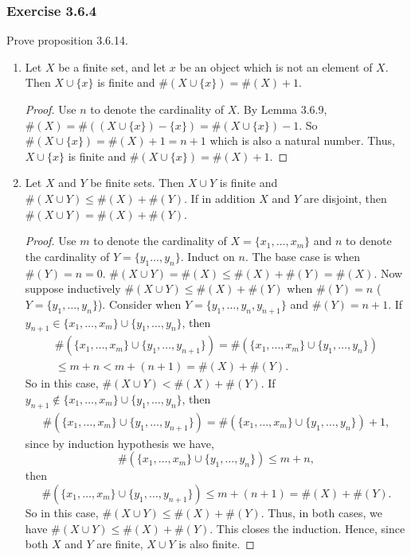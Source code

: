 \documentclass[12pt, letter]{article}
\begin{document}
\subsubsection*{Exercise 3.6.4}
Prove proposition 3.6.14.
\begin{enumerate}
    \item Let $X$ be a finite set, and let $x$ be an object which is not an element of $X$. Then $X\cup\{x\}$ is finite and $\#(X\cup\{x\})=\#(X)+1$.
    \begin{proof}
        Use $n$ to denote the cardinality of $X$. By Lemma 3.6.9, $\#(X)=\#((X\cup\{x\})-\{x\})=\#(X\cup\{x\})-1$. So $\#(X\cup\{x\})=\#(X)+1=n+1$ which is also a natural number.
        Thus, $X\cup\{x\}$ is finite and $\#(X\cup\{x\})=\#(X)+1$.
    \end{proof}
    \item Let $X$ and $Y$ be finite sets. Then $X\cup Y$ is finite and $\#(X\cup Y)\leq \#(X)+\#(Y)$. If in addition $X$ and $Y$ are disjoint, then $\#(X\cup Y)=\#(X)+\#(Y)$.
    \begin{proof}
        Use $m$ to denote the cardinality of $X=\{x_1,\dotsc, x_m\}$ and $n$ to denote the cardinality of $Y=\{y_1\dotsc, y_n\}$. Induct on $n$. The base case is when $\#(Y)=n=0$. $\#(X\cup Y)=\#(X)\leq \#(X)+\#(Y)=\#(X)$.
        Now suppose inductively $\#(X\cup Y)\leq \#(X)+\#(Y)$ when $\#(Y)=n$ ($Y=\{y_1,\dotsc, y_n\}$). Consider when $Y=\{y_1,\dotsc,y_n,y_{n+1}\}$ and $\#(Y)=n+1$. 
        If $y_{n+1}\in \{x_1,\dotsc, x_m\}\cup\{y_1,\dotsc, y_n\}$, then 
        \begin{equation*}
            \begin{gathered}
                \#(\{x_1,\dotsc,x_m\}\cup\{y_1,\dotsc,y_{n+1}\})=\#(\{x_1,\dotsc,x_m\}\cup\{y_1,\dotsc,y_{n}\})\\ \leq m+n<m+(n+1)=\#(X)+\#(Y).
            \end{gathered}
        \end{equation*}
        So in this case, $\#(X\cup Y)<\#(X)+\#(Y)$. If $y_{n+1}\notin \{x_1,\dotsc, x_m\}\cup\{y_1,\dotsc, y_n\}$, then 
        \begin{equation*}
            \begin{gathered}
                \#(\{x_1,\dotsc,x_m\}\cup\{y_1,\dotsc,y_{n+1}\})=\#(\{x_1,\dotsc,x_m\}\cup\{y_1,\dotsc,y_{n}\})+1,
            \end{gathered}
        \end{equation*}
        since by induction hypothesis we have,
        \begin{equation*}
            \#(\{x_1,\dotsc,x_m\}\cup\{y_1,\dotsc,y_{n}\})\leq m+n,
        \end{equation*}
        then 
        \begin{equation*}
            \#(\{x_1,\dotsc,x_m\}\cup\{y_1,\dotsc,y_{n+1}\})\leq m+(n+1)=\#(X)+\#(Y).
        \end{equation*}
        So in this case, $\#(X\cup Y)\leq \#(X)+\#(Y)$. Thus, in both cases, we have $\#(X\cup Y)\leq \#(X)+\#(Y)$. This closes the induction. Hence, since both $X$ and $Y$ are finite,
        $X\cup Y$ is also finite.


\end{proof}
\end{enumerate}
\end{document}
